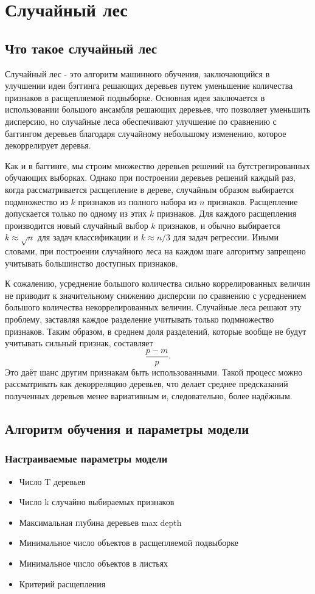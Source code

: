 \section*{Случайный лес}

\subsection*{Что такое случайный лес}
Случайный лес - это алгоритм машинного обучения, заключающийся в улучшении идеи бэггинга решающих деревьев путем уменьшение количества признаков в расщепляемой подвыборке. Основная идея заключается в использовании большого ансамбля решающих деревьев, что позволяет уменьшить дисперсию, но случайные леса обеспечивают улучшение по сравнению с баггингом деревьев благодаря случайному небольшому изменению, которое декоррелирует деревья.

Как и в баггинге, мы строим множество деревьев решений на бутстрепированных обучающих выборках. Однако при построении деревьев решений каждый раз, когда рассматривается расщепление в дереве, случайным образом выбирается подмножество из \(k\) признаков из полного набора из \(n\) признаков. Расщепление допускается только по одному из этих \(k\) признаков. Для каждого расщепления производится новый случайный выбор \(k\) признаков, и обычно выбирается \(k \approx \sqrt{n}\) для задач классификации и \(k \approx n/3\) для задач регрессии. Иными словами, при построении случайного леса на каждом шаге алгоритму запрещено учитывать большинство доступных признаков.

К сожалению, усреднение большого количества сильно коррелированных величин не приводит к значительному снижению дисперсии по сравнению с усреднением большого количества некоррелированных величин. Случайные леса решают эту проблему, заставляя каждое разделение учитывать только подмножество признаков. Таким образом, в среднем доля разделений, которые вообще не будут учитывать сильный признак, составляет
\[
    \frac{p - m}{p}.
\]
Это даёт шанс другим признакам быть использованными. Такой процесс можно рассматривать как декорреляцию деревьев, что делает среднее предсказаний полученных деревьев менее вариативным и, следовательно, более надёжным.

\subsection*{Алгоритм обучения и параметры модели}
\subsubsection*{Настраиваемые параметры модели}
\begin{itemize}
    \item Число T деревьев
    \item Число k случайно выбираемых признаков
    \item Максимальная глубина деревьев max depth
    \item Минимальное число объектов в расщепляемой подвыборке
    \item Минимальное число объектов в листьях
    \item Критерий расщепления
\end{itemize}


